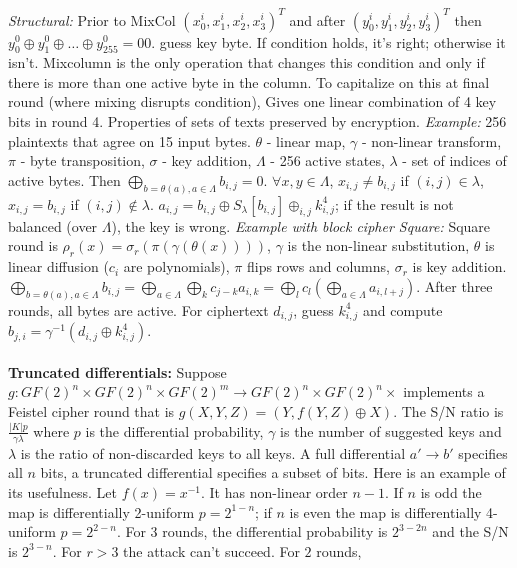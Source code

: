 \emph{Structural:} Prior to MixCol
$(x_0^i, x_1^i, x_2^i, x_3^i)^T$ and after
$(y_0^i, y_1^i, y_2^i, y_3^i)^T$ then $y_0^0 \oplus y_1^0 \oplus \ldots \oplus y_{255}^0 =00$.
guess key byte.   If condition holds, it's right; otherwise it isn't.  Mixcolumn
is the only operation that changes this condition and only if there is more than one active
byte in the column.  To capitalize on this at final round (where mixing disrupts condition),
Gives one linear combination of 4 key bits in round 4.  Properties of
sets of texts preserved by encryption.  \emph{Example:}
256 plaintexts that agree on 15 input bytes.
$\theta$ - linear map, $\gamma$ - non-linear transform,
$\pi$ - byte transposition,  $\sigma$ - key addition,
$\Lambda$ - 256 active states, $\lambda$ - set of indices of active bytes.
Then $\bigoplus_{b= \theta(a), a \in \Lambda} b_{i,j} = 0$.
$\forall x, y \in \Lambda$, 
$x_{i,j} \ne b_{i,j}$ if $(i,j) \in \lambda$,
$x_{i,j} = b_{i,j}$ if $(i,j) \notin \lambda$.
$a_{i,j}= b_{i,j} \oplus S_{\lambda}[b_{i,j}] \oplus_{i,j} k^4_{i,j}$; if the result is
not balanced (over $\Lambda$), the key is wrong.
\emph{Example with block cipher Square:}  Square round is 
$\rho_r(x)= \sigma_r(\pi(\gamma(\theta(x))))$,
$\gamma$ is the non-linear substitution, $\theta$ is linear diffusion ($c_i$ are
polynomials), $\pi$ flips rows and columns, $\sigma_r$ is key addition. 
$ \bigoplus_{b=\theta(a), a \in \Lambda} b_{i,j}=
\bigoplus_{a \in \Lambda} \bigoplus_{k} c_{j-k} a_{i, k} =
\bigoplus_{l} c_{l} (\bigoplus_{a \in \Lambda} a_{i,l+j})$.
After three rounds, all bytes are active.  For ciphertext
$d_{i,j}$, guess $k^4_{i,j}$ and compute
$ b_{j,i}= \gamma^{-1}( d_{i,j}\oplus k^{4}_{i,j} )$.
\\
\\
{\bf Truncated differentials:}
Suppose 
$g: GF(2)^n \times GF(2)^n \times GF(2)^m \rightarrow GF(2)^n \times GF(2)^n \times$
implements a Feistel cipher round that is $g(X,Y,Z)=(Y, f(Y,Z) \oplus X)$.  The
S/N ratio is ${\frac {|K| p} {\gamma \lambda}}$ where $p$ is the differential
probability, $\gamma$ is the number of suggested keys and $\lambda$ is the ratio
of non-discarded keys to all keys.  A full differential $a' \rightarrow b'$
specifies all $n$ bits, a truncated differential specifies a subset of bits.
Here is an example of its usefulness.  Let $f(x)= x^{-1}$.  It has non-linear
order $n-1$.
If $n$ is odd the map is differentially 2-uniform $p= 2^{1-n}$;
if $n$ is even the map is differentially 4-uniform $p= 2^{2-n}$.  For
$3$ rounds, the differential probability is $2^{3-2n}$ and the S/N is
$2^{3-n}$.  For $r>3$ the attack can't succeed.  For $2$ rounds,
